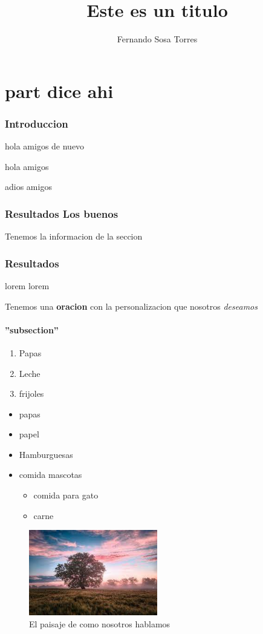 \documentclass[10pt,a4paper]{article}
\title{Este es un titulo}
\author{Fernando Sosa Torres}
\begin{document}
\maketitle
\part{part dice ahi}
\section{Introduccion} 
hola amigos de nuevo
\blindtext

hola amigos

adios amigos
\section{Resultados Los buenos}
Tenemos la informacion de la seccion
\section{Resultados}
lorem lorem

Tenemos una \textbf{oracion} con la personalizacion que nosotros \textit{deseamos}
\subsection{''subsection''}

\begin{enumerate}
	\item Papas
	\item Leche
	\item frijoles
\end{enumerate}
\begin{itemize}
	\item papas
	\item papel
	\item Hamburguesas
	\item comida mascotas
	\begin{itemize}
		\item comida para gato
		\item carne
	\end{itemize}
\end{itemize}

\begin{figure}[H]
\centering
\includegraphics[width=0.5\textwidth]{imagen}
\caption{El paisaje de como nosotros hablamos}
\label{paisaje}
\end{figure}
\end{document}

